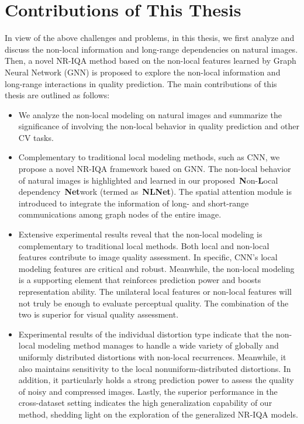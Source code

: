 \section{Contributions of This Thesis}
In view of the above challenges and problems, in this thesis, we first analyze and discuss the non-local information and long-range dependencies on natural images. Then, a novel NR-IQA method based on the non-local features learned by Graph Neural Network (GNN) is proposed to explore the non-local information and long-range interactions in quality prediction. The main contributions of this thesis are outlined as follows:
\begin{itemize}
	\item We analyze the non-local modeling on natural images and summarize the significance of involving the non-local behavior in quality prediction and other CV tasks.
	\item Complementary to traditional local modeling methods, such as CNN, we propose a novel NR-IQA framework based on GNN. The non-local behavior of natural images is highlighted and learned in our proposed~\textbf{N}on-\textbf{L}ocal dependency~\textbf{Net}work (termed as~\textbf{NLNet}). The spatial attention module is introduced to integrate the information of long- and short-range communications among graph nodes of the entire image.
	\item Extensive experimental results reveal that the non-local modeling is complementary to traditional local methods. Both local and non-local features contribute to image quality assessment. In specific, CNN's local modeling features are critical and robust. Meanwhile, the non-local modeling is a supporting element that reinforces prediction power and boosts representation ability. The unilateral local features or non-local features will not truly be enough to evaluate perceptual quality. The combination of the two is superior for visual quality assessment.
	\item Experimental results of the individual distortion type indicate that the non-local modeling method manages to handle a wide variety of globally and uniformly distributed distortions with non-local recurrences. Meanwhile, it also maintains sensitivity to the local nonuniform-distributed distortions. In addition, it particularly holds a strong prediction power to assess the quality of noisy and compressed images. Lastly, the superior performance in the cross-dataset setting indicates the high generalization capability of our method, shedding light on the exploration of the generalized NR-IQA models.
\end{itemize}

